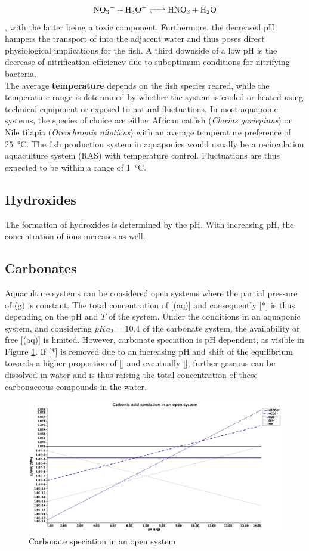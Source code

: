 \documentclass{scrartcl}
\begin{document}
\begin{align}
	\ce{NO3- + H3O+ <=> HNO3 + H2O}
\end{align}
, with the latter being a toxic component. Furthermore, the decreased pH hampers the transport of  into the adjacent water and thus poses direct physiological implications for the fish. A third downside of a low pH is the decrease of nitrification efficiency due to suboptimum conditions for nitrifying bacteria.\\
%
The average \textbf{temperature} depends on the fish species reared, while the temperature range is determined by whether the system is cooled or heated using technical equipment or exposed to natural fluctuations. In most aquaponic systems, the species of choice are either African catfish (\emph{Clarias gariepinus}) or Nile tilapia (\emph{Oreochromis niloticus}) with an average temperature preference of \SI{25}{\degreeCelsius}. The fish production system in aquaponics would usually be a recirculation aquaculture system (RAS) with temperature control. Fluctuations are thus expected to be within a range of \SI{1}{\degreeCelsius}. 
%
%
%
\subsection{Hydroxides}
The formation of hydroxides is determined by the pH. With increasing pH, the concentration of  ions increases as well.
%
%
%
\subsection{Carbonates}
Aquaculture systems can be considered open systems where the partial pressure of (g) is constant. The total concentration of [(aq)] and consequently [*] is thus depending on the pH and $T$ of the system. Under the conditions in an aquaponic system, and considering $pKa_{2} = 10.4$ of the carbonate system, the availability of free [(aq)] is limited. However, carbonate speciation is pH dependent, as visible in Figure \ref{fig:carbonate}. If [*] is removed due to an increasing pH and shift of the equilibrium towards a higher proportion of [] and eventually [], further gaseous  can be dissolved in water and is thus raising the total concentration of these carbonaceous compounds in the water.
%
\begin{figure}
	\includegraphics[scale=0.35]{plots/log_carbonic_acid.jpg}
	\caption{Carbonate speciation in an open system}
	\label{fig:carbonate}
\end{figure}
%
%
%
\end{document}
